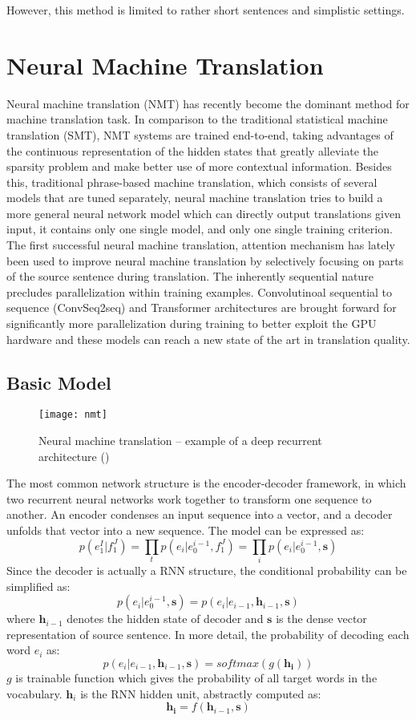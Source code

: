 However, this method is limited to rather short sentences and simplistic settings.
\section{Neural Machine Translation}
Neural machine translation (NMT) has recently become the dominant method for machine translation task. In comparison to the traditional statistical machine translation (SMT), NMT systems are trained end-to-end, taking advantages of the continuous representation of the hidden states that greatly alleviate the sparsity problem and make better use of more contextual information. Besides this, traditional phrase-based machine translation, which consists of several models that are tuned separately, neural machine translation tries to build a more general neural network model which can directly output translations given input, it contains only one single model, and only one single training criterion. \\
The first successful neural machine translation, attention mechanism has lately been used to improve neural machine translation by selectively focusing on parts of the source sentence during translation. The inherently sequential nature precludes parallelization within training examples. Convolutinoal sequential to sequence (ConvSeq2seq) and Transformer architectures are brought forward  for significantly more parallelization during training to better exploit the GPU hardware and these models can reach a new state of the art in
translation quality.


\subsection{Basic Model}
\begin{figure}[t]
	\texttt{[image: nmt]}
	\caption{ Neural machine translation – example of a deep recurrent architecture (\cite{luong2015effective})}
	\centering
\end{figure}

The most common network structure is the encoder-decoder framework, in which two recurrent neural networks work together to transform one sequence to another. An encoder condenses an input sequence into a vector, and a decoder unfolds that vector into a new sequence. The model can be expressed as:
\[ p(e_1^I | f_1^J) = \prod_{t} p(e_i|e_0^{i-1}, f_1^J) = \prod_{i} {p(e_i|e_0^{i-1},  {\bm{s}})} \] 
Since the decoder is actually a RNN structure, the conditional probability can be simplified as:
\[ p(e_i|e_0^{i-1}, \bm{s}) = p(e_i| e_{i-1}, \bm{h}_{i-1}, \bm{s}) \]
where $\bm{h}_{i-1}$ denotes the hidden state of decoder and $\bm{s}$ is the dense vector representation of source sentence.
In more detail, the probability of decoding each word $e_i$ as:
\[ p(e_i| e_{i-1}, \bm{h}_{i-1}, {\bm{s}}) = softmax(g(\bm{h_i}))\]
$g$ is trainable function which gives the probability of all target words in the vocabulary. $\bm{h}_i$ is the RNN hidden unit, abstractly computed as:
\[ \bm{h_i} = f(\bm{h}_{i-1}, \bm{s})\]

